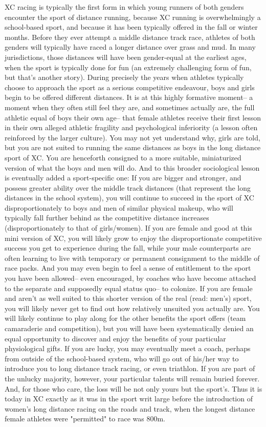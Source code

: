 XC racing is typically the first form in which young runners of both genders encounter the sport of distance running, because XC running is overwhelmingly a school-based sport, and because it has been typically offered in the fall or winter months. Before they ever attempt a middle distance track race, athletes of both genders will typically have raced a longer distance over grass and mud. In many jurisdictions, those distances will have been gender-equal at the earliest ages, when the sport is typically done for fun (an extremely challenging form of fun, but that's another story). During precisely the years when athletes typically choose to approach the sport as a serious competitive endeavour, boys and girls begin to be offered different distances. It is at this highly formative moment-- a moment when they often still feel they are, and sometimes actually are, the full athletic equal of boys their own age-- that female athletes receive their first lesson in their own alleged athletic fragility and psychological inferiority (a lesson often reinforced by the larger culture). You may not yet understand why, girls are told, but you are not suited to running the same distances as boys in the long distance sport of XC. You are henceforth consigned to a more suitable, miniaturized version of what the boys and men will do. And to this broader sociological lesson is eventually added a sport-specific one: If you are bigger and stronger, and possess greater ability over the middle track distances (that represent the long distances in the school system), you will continue to succeed in the sport of XC disproportionately to boys and men of similar physical makeup, who will typically fall further behind as the competitive distance increases (disproportionately to that of girls/women). If you are female and good at this mini version of XC, you will likely grow to enjoy the disproportionate competitive success you get to experience during the fall, while your male counterparts are often learning to live with temporary or permanent consignment to the middle of race packs. And you may even begin to feel a sense of entitlement to the sport you have been allowed-- even encouraged, by coaches who have become attached to the separate and supposedly equal status quo-- to colonize. If you are female and aren't as well suited to this shorter version of the real (read: men's) sport, you will likely never get to find out how relatively unsuited you actually are. You will likely continue to play along for the other benefits the sport offers (team camaraderie and competition), but you will have been systematically denied an equal opportunity to discover and enjoy the benefits of your particular physiological gifts. If you are lucky, you may eventually meet a coach, perhaps from outside of the school-based system, who will go out of his/her way to introduce you to long distance track racing, or even triathlon. If you are part of the unlucky majority, however, your particular talents will remain buried forever. And, for those who care, the loss will be not only yours but the sport's. Thus it is today in XC exactly as it was in the sport writ large before the introduction of women's long distance racing on the roads and track, when the longest distance female athletes were "permitted" to race was 800m.

